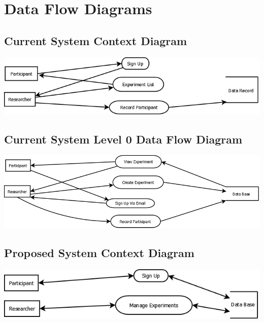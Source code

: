 \section{Data Flow Diagrams}
\subsection{Current System Context Diagram}
\includegraphics[width=6in]{../other/data-flow-diagrams/current_system_context_diagram.png}\\

\subsection{Current System Level 0 Data Flow Diagram}
\includegraphics[width=6in]{../other/data-flow-diagrams/current_system_level0.png}\\

\subsection{Proposed System Context Diagram}
\includegraphics[width=6in]{../other/data-flow-diagrams/new_system_context.png}\\

